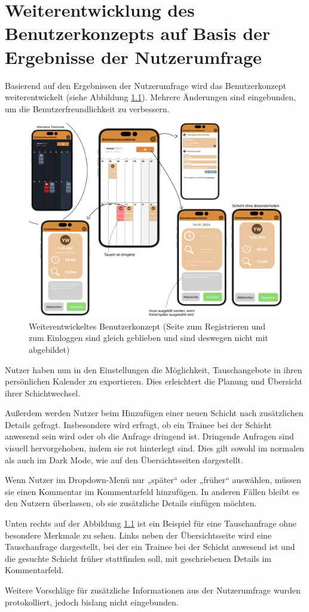 \chapter{Weiterentwicklung des Benutzerkonzepts auf Basis der Ergebnisse der Nutzerumfrage}

Basierend auf den Ergebnissen der Nutzerumfrage wird das Benutzerkonzept weiterentwickelt (siehe Abbildung \ref{Bedienungskonzept_V2}). Mehrere Änderungen sind eingebunden, um die Benutzerfreundlichkeit zu verbessern.

\begin{figure}[h]
    \centering
    \includegraphics[clip,width=1\linewidth]{images/Bedienungskonzept_V2.png}
    \caption[Weiterentwickeltes Benutzerkonzept]{Weiterentwickeltes Benutzerkonzept (Seite zum Registrieren und zum Einloggen sind gleich geblieben und sind deswegen nicht mit abgebildet)}
    \label{Bedienungskonzept_V2}
\end{figure}

Nutzer haben nun in den Einstellungen die Möglichkeit, Tauschangebote in ihren persönlichen Kalender zu exportieren. Dies erleichtert die Planung und Übersicht ihrer Schichtwechsel.

Außerdem werden Nutzer beim Hinzufügen einer neuen Schicht nach zusätzlichen Details gefragt. Insbesondere wird erfragt, ob ein Trainee bei der Schicht anwesend sein wird oder ob die Anfrage dringend ist. Dringende Anfragen sind visuell hervorgehoben, indem sie rot hinterlegt sind. Dies gilt sowohl im normalen als auch im Dark Mode, wie auf den Übersichtsseiten dargestellt.

Wenn Nutzer im Dropdown-Menü nur „später“ oder „früher“ auswählen, müssen sie einen Kommentar im Kommentarfeld hinzufügen. In anderen Fällen bleibt es den Nutzern überlassen, ob sie zusätzliche Details einfügen möchten.

Unten rechts auf der Abbildung \ref{Bedienungskonzept_V2} ist ein Beispiel für eine Tauschanfrage ohne besondere Merkmale zu sehen. Links neben der Übersichtsseite wird eine Tauschanfrage dargestellt, bei der ein Trainee bei der Schicht anwesend ist und die gesuchte Schicht früher stattfinden soll, mit geschriebenen Details im Kommentarfeld.

Weitere Vorschläge für zusätzliche Informationen aus der Nutzerumfrage wurden protokolliert, jedoch bislang nicht eingebunden.